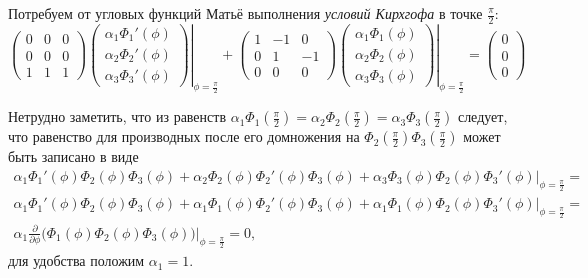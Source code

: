 Потребуем от угловых функций Матьё выполнения \textit{условий Кирхгофа} в точке $\frac{\pi}{2}$:
\begin{equation}
\begin{pmatrix}
0	&	0	&	0	\\
0	&	0	&	0	\\
1	&	1	&	1
\end{pmatrix} 
\left.
\begin{pmatrix}
\alpha_1 \Phi_1'(\phi)		\\
\alpha_2 \Phi_2'(\phi)		\\
\alpha_3 \Phi_3'(\phi)	
\end{pmatrix}
\right|_{\phi = \frac{\pi}{2}} + 
\begin{pmatrix}
1	&	-1	&	0	\\
0	&	1	&	-1	\\
0	&	0	&	0
\end{pmatrix} 
\left.
\begin{pmatrix}
\alpha_1 \Phi_1(\phi)		\\
\alpha_2 \Phi_2(\phi)		\\
\alpha_3 \Phi_3(\phi)	
\end{pmatrix} 
\right|_{\phi = \frac{\pi}{2}} = 
\begin{pmatrix}
0	\\	0	\\	0
\end{pmatrix} 
\label{eq:ellipsesKirchhoffCondition}
\end{equation}

Нетрудно заметить, что из равенств $\alpha_1 \Phi_1( \frac{\pi}{2})=\alpha_2 \Phi_2( \frac{\pi}{2}) = \alpha_3 \Phi_3( \frac{\pi}{2})	$ следует, что равенство для производных после его домножения на $\Phi_2(\frac{\pi}{2}) \Phi_3(\frac{\pi}{2})$ может быть записано в виде
\begin{multline}
\left. \alpha_1 \Phi_1'( \phi ) \Phi_2(\phi) \Phi_3(\phi) + \alpha_2 \Phi_2(\phi) \Phi_2'(\phi) \Phi_3(\phi) + \alpha_3 \Phi_3(\phi) \Phi_2(\phi) \Phi_3'(\phi) \right|_{\phi = \frac{\pi}{2}} = \\
\left. \alpha_1 \Phi_1'( \phi ) \Phi_2(\phi) \Phi_3(\phi) + \alpha_1 \Phi_1(\phi) \Phi_2'(\phi) \Phi_3(\phi) + \alpha_1 \Phi_1(\phi) \Phi_2(\phi) \Phi_3'(\phi) \right|_{\phi = \frac{\pi}{2}} = \\
\alpha_1 \frac{\partial}{\partial \phi} \left. \bigg(
\Phi_1( \phi )\Phi_2(\phi) \Phi_3(\phi) \bigg)  \right|_{\phi = \frac{\pi}{2}} = 0,
\end{multline}
для удобства положим $\alpha_1 = 1$. 

